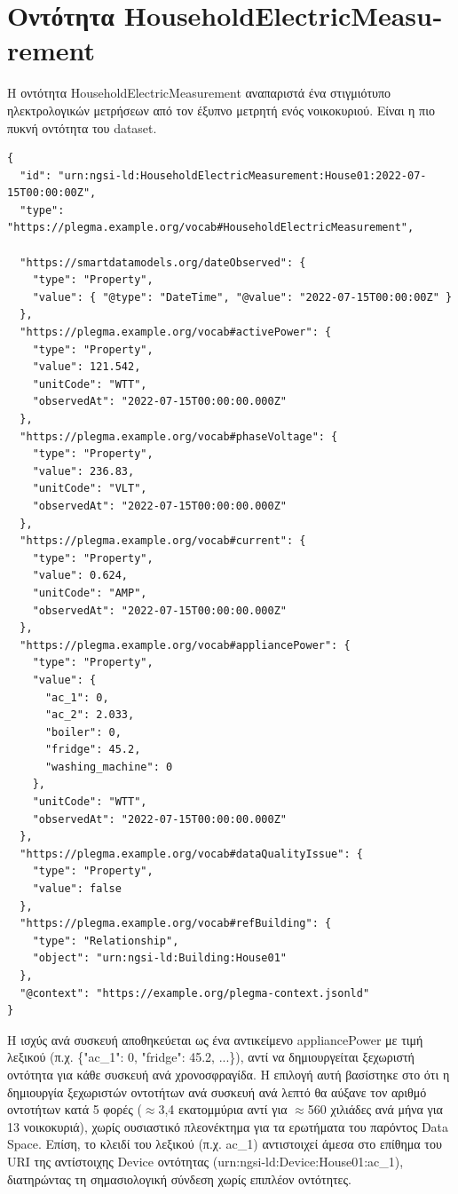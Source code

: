 \section{Οντότητα \textlatin{HouseholdElectricMeasurement}}
\label{sec:entity-electric}

Η οντότητα \textlatin{HouseholdElectricMeasurement} αναπαριστά ένα στιγμιότυπο
ηλεκτρολογικών μετρήσεων από τον έξυπνο μετρητή ενός νοικοκυριού. Είναι η
πιο πυκνή οντότητα του \textlatin{dataset}.

\vspace{0.5cm}
\begin{lstlisting}[language={}, caption={HouseholdElectricMeasurement entity for House01.}]
{
  "id": "urn:ngsi-ld:HouseholdElectricMeasurement:House01:2022-07-15T00:00:00Z",
  "type": "https://plegma.example.org/vocab#HouseholdElectricMeasurement",

  "https://smartdatamodels.org/dateObserved": {
    "type": "Property",
    "value": { "@type": "DateTime", "@value": "2022-07-15T00:00:00Z" }
  },
  "https://plegma.example.org/vocab#activePower": {
    "type": "Property",
    "value": 121.542,
    "unitCode": "WTT",
    "observedAt": "2022-07-15T00:00:00.000Z"
  },
  "https://plegma.example.org/vocab#phaseVoltage": {
    "type": "Property",
    "value": 236.83,
    "unitCode": "VLT",
    "observedAt": "2022-07-15T00:00:00.000Z"
  },
  "https://plegma.example.org/vocab#current": {
    "type": "Property",
    "value": 0.624,
    "unitCode": "AMP",
    "observedAt": "2022-07-15T00:00:00.000Z"
  },
  "https://plegma.example.org/vocab#appliancePower": {
    "type": "Property",
    "value": {
      "ac_1": 0,
      "ac_2": 2.033,
      "boiler": 0,
      "fridge": 45.2,
      "washing_machine": 0
    },
    "unitCode": "WTT",
    "observedAt": "2022-07-15T00:00:00.000Z"
  },
  "https://plegma.example.org/vocab#dataQualityIssue": {
    "type": "Property",
    "value": false
  },
  "https://plegma.example.org/vocab#refBuilding": {
    "type": "Relationship",
    "object": "urn:ngsi-ld:Building:House01"
  },
  "@context": "https://example.org/plegma-context.jsonld"
}
\end{lstlisting}

Η ισχύς ανά συσκευή αποθηκεύεται ως ένα αντικείμενο
\textlatin{appliancePower} με τιμή λεξικού (π.χ. \textlatin{\{"ac\_1": 0, "fridge":
45.2, ...\}}), αντί να δημιουργείται ξεχωριστή οντότητα για κάθε συσκευή ανά
χρονοσφραγίδα. Η επιλογή αυτή βασίστηκε στο ότι η δημιουργία ξεχωριστών οντοτήτων ανά συσκευή
ανά λεπτό θα αύξανε τον αριθμό οντοτήτων κατά 5 φορές ($\approx$3,4
εκατομμύρια αντί για $\approx$560 χιλιάδες ανά μήνα για 13 νοικοκυριά),
χωρίς ουσιαστικό πλεονέκτημα για τα ερωτήματα του παρόντος
\textlatin{Data Space}. Επίση, το κλειδί του λεξικού (π.χ.
\textlatin{ac\_1}) αντιστοιχεί άμεσα στο επίθημα του \textlatin{URI} της
αντίστοιχης \textlatin{Device} οντότητας
(\textlatin{urn:ngsi-ld:Device:House01:ac\_1}), διατηρώντας τη σημασιολογική
σύνδεση χωρίς επιπλέον οντότητες.


